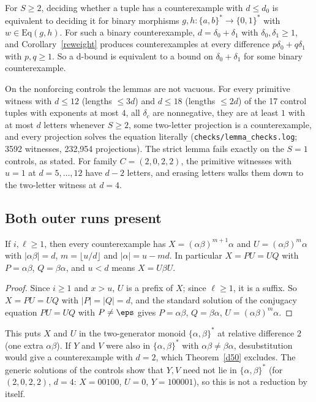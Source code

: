 \begin{corollary}\label{mind}
For \(S\ge2\), deciding whether a tuple has a counterexample with \(d\le d_0\) is equivalent to deciding it for binary morphisms \(g,h\colon\{a,b\}^*\to\{0,1\}^*\) with \(w\in\mathrm{Eq}(g,h)\). For such a binary counterexample, \(d=\delta_0+\delta_1\) with \(\delta_0,\delta_1\ge1\), and Corollary~\ref{reweight} produces counterexamples at every difference \(p\delta_0+q\delta_1\) with \(p,q\ge1\). So a d-bound is equivalent to a bound on \(\delta_0+\delta_1\) for some binary counterexample.
\end{corollary}

\begin{remark}
On the nonforcing controls the lemmas are not vacuous. For every primitive witness with \(d\le12\) (lengths \(\le3d\)) and \(d\le18\) (lengths \(\le2d\)) of the 17 control tuples with exponents at most \(4\), all \(\delta_c\) are nonnegative, they are at least \(1\) with at most \(d\) letters whenever \(S\ge2\), some two-letter projection is a counterexample, and every projection solves the equation literally (\texttt{checks/lemma\_checks.log}; 3592 witnesses, 232{,}954 projections). The strict lemma fails exactly on the \(S=1\) controls, as stated. For family \(C=(2,0,2,2)\), the primitive witnesses with \(u=1\) at \(d=5,\dots,12\) have \(d-2\) letters, and erasing letters walks them down to the two-letter witness at \(d=4\).
\end{remark}

\subsection{Both outer runs present}
\begin{lemma}\label{conj}
If \(i,\ell\ge1\), then every counterexample has \(X=(\alpha\beta)^{m+1}\alpha\) and \(U=(\alpha\beta)^m\alpha\) with \(|\alpha\beta|=d\), \(m=\lfloor u/d\rfloor\) and \(|\alpha|=u-md\). In particular \(X=PU=UQ\) with \(P=\alpha\beta\), \(Q=\beta\alpha\), and \(u<d\) means \(X=U\beta U\).
\end{lemma}
\begin{proof}
Since \(i\ge1\) and \(x>u\), \(U\) is a prefix of \(X\); since \(\ell\ge1\), it is a suffix. So \(X=PU=UQ\) with \(|P|=|Q|=d\), and the standard solution of the conjugacy equation \(PU=UQ\) with \(P\ne\eps\) gives \(P=\alpha\beta\), \(Q=\beta\alpha\), \(U=(\alpha\beta)^m\alpha\).
\end{proof}
This puts \(X\) and \(U\) in the two-generator monoid \(\{\alpha,\beta\}^*\) at relative difference \(2\) (one extra \(\alpha\beta\)). If \(Y\) and \(V\) were also in \(\{\alpha,\beta\}^*\) with \(\alpha\beta\ne\beta\alpha\), desubstitution would give a counterexample with \(d=2\), which Theorem~\ref{d50} excludes. The generic solutions of the controls show that \(Y,V\) need not lie in \(\{\alpha,\beta\}^*\) (for \((2,0,2,2)\), \(d=4\): \(X=00100\), \(U=0\), \(Y=100001\)), so this is not a reduction by itself.

